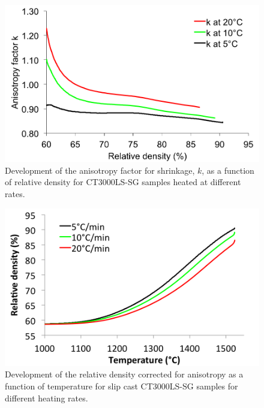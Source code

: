 \newpage
\begin{figure}[H]
	\centering
	\includegraphics[width=\textwidth]{Chapter-6/Figures/Figure2.png}
	\caption{Development of the anisotropy factor for shrinkage, $k$, as a function of relative density for CT3000LS-SG samples heated at different rates.}
	\label{Ch6-figure:Figure2}
\end{figure}

\newpage
\begin{figure}[H]
	\centering
	\includegraphics[width=\textwidth]{Chapter-6/Figures/Figure3.png}
	\caption{Development of the relative density corrected for anisotropy as a function of temperature for slip cast CT3000LS-SG samples for different heating rates.}
	\label{Ch6-figure:Figure3}
\end{figure}

